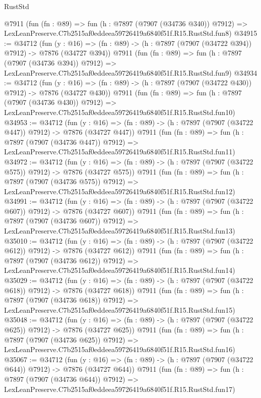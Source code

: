 \begin{lexlean}{RustStd}
\begin{coremodule}
    @7911
    (fun (fn : @89) =>
    fun (h : @7897 (@7907 (@34736 @340)) @7912) =>
    LexLeanPreserve.C7b2515af0eddeea59726419a6840f51f.R15.RustStd.fun8)
@34915 := @34712
    (fun (y : @16) => (fn : @89) -> (h : @7897 (@7907 (@34722 @394)) @7912) -> @7876 (@34727 @394))
    @7911
    (fun (fn : @89) =>
    fun (h : @7897 (@7907 (@34736 @394)) @7912) =>
    LexLeanPreserve.C7b2515af0eddeea59726419a6840f51f.R15.RustStd.fun9)
@34934 := @34712
    (fun (y : @16) => (fn : @89) -> (h : @7897 (@7907 (@34722 @430)) @7912) -> @7876 (@34727 @430))
    @7911
    (fun (fn : @89) =>
    fun (h : @7897 (@7907 (@34736 @430)) @7912) =>
    LexLeanPreserve.C7b2515af0eddeea59726419a6840f51f.R15.RustStd.fun10)
@34953 := @34712
    (fun (y : @16) => (fn : @89) -> (h : @7897 (@7907 (@34722 @447)) @7912) -> @7876 (@34727 @447))
    @7911
    (fun (fn : @89) =>
    fun (h : @7897 (@7907 (@34736 @447)) @7912) =>
    LexLeanPreserve.C7b2515af0eddeea59726419a6840f51f.R15.RustStd.fun11)
@34972 := @34712
    (fun (y : @16) => (fn : @89) -> (h : @7897 (@7907 (@34722 @575)) @7912) -> @7876 (@34727 @575))
    @7911
    (fun (fn : @89) =>
    fun (h : @7897 (@7907 (@34736 @575)) @7912) =>
    LexLeanPreserve.C7b2515af0eddeea59726419a6840f51f.R15.RustStd.fun12)
@34991 := @34712
    (fun (y : @16) => (fn : @89) -> (h : @7897 (@7907 (@34722 @607)) @7912) -> @7876 (@34727 @607))
    @7911
    (fun (fn : @89) =>
    fun (h : @7897 (@7907 (@34736 @607)) @7912) =>
    LexLeanPreserve.C7b2515af0eddeea59726419a6840f51f.R15.RustStd.fun13)
@35010 := @34712
    (fun (y : @16) => (fn : @89) -> (h : @7897 (@7907 (@34722 @612)) @7912) -> @7876 (@34727 @612))
    @7911
    (fun (fn : @89) =>
    fun (h : @7897 (@7907 (@34736 @612)) @7912) =>
    LexLeanPreserve.C7b2515af0eddeea59726419a6840f51f.R15.RustStd.fun14)
@35029 := @34712
    (fun (y : @16) => (fn : @89) -> (h : @7897 (@7907 (@34722 @618)) @7912) -> @7876 (@34727 @618))
    @7911
    (fun (fn : @89) =>
    fun (h : @7897 (@7907 (@34736 @618)) @7912) =>
    LexLeanPreserve.C7b2515af0eddeea59726419a6840f51f.R15.RustStd.fun15)
@35048 := @34712
    (fun (y : @16) => (fn : @89) -> (h : @7897 (@7907 (@34722 @625)) @7912) -> @7876 (@34727 @625))
    @7911
    (fun (fn : @89) =>
    fun (h : @7897 (@7907 (@34736 @625)) @7912) =>
    LexLeanPreserve.C7b2515af0eddeea59726419a6840f51f.R15.RustStd.fun16)
@35067 := @34712
    (fun (y : @16) => (fn : @89) -> (h : @7897 (@7907 (@34722 @644)) @7912) -> @7876 (@34727 @644))
    @7911
    (fun (fn : @89) =>
    fun (h : @7897 (@7907 (@34736 @644)) @7912) =>
    LexLeanPreserve.C7b2515af0eddeea59726419a6840f51f.R15.RustStd.fun17)

\end{coremodule}
\end{lexlean}
